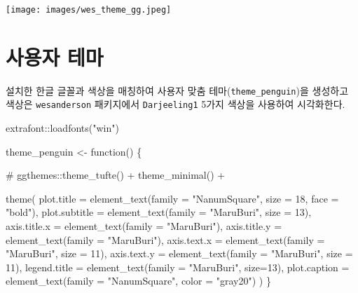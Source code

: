 \documentclass[
  letterpaper,
]{book}
\newenvironment{Shaded}{\begin{snugshade}}{\end{snugshade}}
\newcommand{\AttributeTok}[1]{\textcolor[rgb]{0.40,0.45,0.13}{#1}}
\newcommand{\CommentTok}[1]{\textcolor[rgb]{0.37,0.37,0.37}{#1}}
\newcommand{\ControlFlowTok}[1]{\textcolor[rgb]{0.00,0.23,0.31}{#1}}
\newcommand{\DecValTok}[1]{\textcolor[rgb]{0.68,0.00,0.00}{#1}}
\newcommand{\FunctionTok}[1]{\textcolor[rgb]{0.28,0.35,0.67}{#1}}
\newcommand{\NormalTok}[1]{\textcolor[rgb]{0.00,0.23,0.31}{#1}}
\newcommand{\OtherTok}[1]{\textcolor[rgb]{0.00,0.23,0.31}{#1}}
\newcommand{\SpecialCharTok}[1]{\textcolor[rgb]{0.37,0.37,0.37}{#1}}
\newcommand{\StringTok}[1]{\textcolor[rgb]{0.13,0.47,0.30}{#1}}
\begin{document}
\texttt{[image: images/wes\_theme\_gg.jpeg]}

\hypertarget{uxc0acuxc6a9uxc790-uxd14cuxb9c8}{%
\section{사용자 테마}\label{uxc0acuxc6a9uxc790-uxd14cuxb9c8}}

설치한 한글 글꼴과 색상을 매칭하여 사용자 맞춤
테마(\texttt{theme\_penguin})을 생성하고 색상은 \texttt{wesanderson}
패키지에서 \texttt{Darjeeling1} 5가지 색상을 사용하여 시각화한다.

\begin{Shaded}
\begin{Highlighting}[]
\NormalTok{extrafont}\SpecialCharTok{::}\FunctionTok{loadfonts}\NormalTok{(}\StringTok{"win"}\NormalTok{)}

\NormalTok{theme\_penguin }\OtherTok{\textless{}{-}} \ControlFlowTok{function}\NormalTok{() \{}
  
  \CommentTok{\# ggthemes::theme\_tufte() +}
  \FunctionTok{theme\_minimal}\NormalTok{() }\SpecialCharTok{+}
    
  \FunctionTok{theme}\NormalTok{(}
      \AttributeTok{plot.title     =} \FunctionTok{element\_text}\NormalTok{(}\AttributeTok{family =} \StringTok{"NanumSquare"}\NormalTok{, }\AttributeTok{size =} \DecValTok{18}\NormalTok{, }\AttributeTok{face =} \StringTok{"bold"}\NormalTok{),}
      \AttributeTok{plot.subtitle  =} \FunctionTok{element\_text}\NormalTok{(}\AttributeTok{family =} \StringTok{"MaruBuri"}\NormalTok{, }\AttributeTok{size =} \DecValTok{13}\NormalTok{),}
      \AttributeTok{axis.title.x   =} \FunctionTok{element\_text}\NormalTok{(}\AttributeTok{family =} \StringTok{"MaruBuri"}\NormalTok{),}
      \AttributeTok{axis.title.y   =} \FunctionTok{element\_text}\NormalTok{(}\AttributeTok{family =} \StringTok{"MaruBuri"}\NormalTok{),}
      \AttributeTok{axis.text.x    =} \FunctionTok{element\_text}\NormalTok{(}\AttributeTok{family =} \StringTok{"MaruBuri"}\NormalTok{, }\AttributeTok{size =} \DecValTok{11}\NormalTok{),}
      \AttributeTok{axis.text.y    =} \FunctionTok{element\_text}\NormalTok{(}\AttributeTok{family =} \StringTok{"MaruBuri"}\NormalTok{, }\AttributeTok{size =} \DecValTok{11}\NormalTok{),}
      \AttributeTok{legend.title   =} \FunctionTok{element\_text}\NormalTok{(}\AttributeTok{family =} \StringTok{"MaruBuri"}\NormalTok{, }\AttributeTok{size=}\DecValTok{13}\NormalTok{),}
      \AttributeTok{plot.caption   =} \FunctionTok{element\_text}\NormalTok{(}\AttributeTok{family =} \StringTok{"NanumSquare"}\NormalTok{, }\AttributeTok{color =} \StringTok{"gray20"}\NormalTok{)}
\NormalTok{  )}
\NormalTok{\}}


\end{Highlighting}
\end{Shaded}
\end{document}
